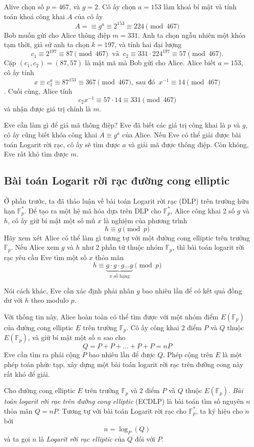 \begin{example}
	Alive chọn số $p =467$, và $g = 2$. Cô ấy chọn $a = 153$ làm khoá bí mật và tính toán khoá công khai $A$ của cô ấy
	$$ A = \equiv g^a \equiv 2^{153} \equiv 224 \pmod{467}$$
	Bob muốn gửi cho Alice thông điệp $m = 331$. Anh ta chọn ngẫu nhiên một
	khóa tạm thời, giả sử anh ta chọn $k = 197$, và tính hai đại lượng
	$$ c_1 \equiv 2^{197} \equiv 87 \pmod{467} \ \text{ và } \ c_2 \equiv 331 \cdot 224^{197} \equiv 57 \pmod{467}.$$
	Cặp $(c_1, c_2) = (87, 57)$ là mật mã mà Bob gửi cho Alice.
	Alice biết $a = 153$, cô ấy tính
	$$ x \equiv c_1^a \equiv 87^{153} \equiv 367 \pmod{467}, \ \text{sau đó } \ x^{-1} \equiv 14 \pmod{467}$$.
	Cuối cùng, Alice tính
	$$c_2x^{-1} \equiv 57 \cdot 14 \equiv 331 \pmod{467}$$
	và nhận được giá trị chính là $m$.
\end{example}
Eve cần làm gì để giả mã thông điệp? Eve đã biết các giá trị công khai là $p$ và $g$, cô ấy cũng biết khóa công khai $A\equiv g^a$ của Alice.
Nếu Eve có thể giải được bài toán Logarit rời rạc, cô ấy sẽ tìm được $a$ và giải mã được thông điệp. Còn không, Eve rất khó tìm được $m$.
\subsection{Bài toán Logarit rời rạc đường cong elliptic}
Ở phần trước, ta đã thảo luận về bài toán Logarit rời rạc (DLP) trên trường hữu hạn $\mathbb{F}^*_p$.
Để tạo ra một hệ mã hóa dựa trên DLP cho $\mathbb{F}^*_p$, Alice công khai 2 số $g$ và $h$, cô ấy giữ bí mật một số mũ $x$ là nghiệm của phương trình
$$ h \equiv g \pmod{p} $$
Hãy xem xét Alice có thể làm gì tương tự với một đường cong elliptic trên trường $\mathbb{F}_p$.  Nếu Alice xem $g$ và $h$ như 2 phần tử thuộc nhóm $\mathbb{F}_p$,
thì bài toán logarit rời rạc yêu cầu Eve tìm một số $x$ thỏa mãn
$$ h \equiv \underbrace{ g \cdot g \cdot g \ldots g }_{\text{$x$ số hạng}} \pmod{p} $$

Nói cách khác, Eve cần xác định phải nhân $g$ bao nhiêu lần để có kết quả đồng dư với $h$ theo modulo $p$.

Với thống tin này, Alice hoàn toàn có thể tìm được với một nhóm điểm $E(\mathbb{F}_p)$ của đường cong elliptic $E$ trên trường $\mathbb{F}_p$.
Cô ấy công khai 2 điểm $P$ và $Q$ thuộc $E(\mathbb{F}_p)$, và giữ bí mật một số $n$ sao cho
$$ Q = P+P+ \ldots +P+P = nP$$
Eve cần tìm ra phải cộng $P$ bao nhiêu lần để được $Q$. Phép cộng trên $E$ là một phép toán phức tạp, xây dựng một bài toán logarit rời rạc trên đường cong này rất khó để giải.

\begin{definition}
	Cho đường cong elliptic $E$ trên trường $\mathbb{F}_p$ và 2 điểm $P$ và $Q$ thuộc $E(\mathbb{F}_p)$. \textit{Bài toán logarit rời rạc trên đường cong elliptic} (ECDLP) là bài toán tìm số nguyên $n$ thỏa mãn $Q=nP$.
	Tương tự với bài toán Logarit rời rạc cho $\mathbb{F}^*_p$, ta ký hiệu cho $n$ bởi
	$$  n = \log_P(Q)$$
	và ta gọi $n$ là \textit{Logarit rời rạc elliptic} của $Q$ đối với $P$.
\end{definition}